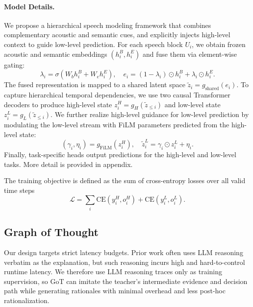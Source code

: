 \paragraph{Model Details.}
We propose a hierarchical speech modeling framework that combines complementary acoustic and semantic cues, and explicitly injects high-level context to guide low-level prediction. For each speech block $U_i$, we obtain frozen acoustic and semantic embeddings $(h_i^{B}, h_i^{E})$ and fuse them via element-wise gating:
\[
\lambda_i=\sigma(W_b h_i^{B}+W_e h_i^{E}),\quad
e_i=(1-\lambda_i)\odot h_i^{B}+\lambda_i\odot h_i^{E}.
\]
The fused representation is mapped to a shared latent space $\tilde z_i=g_{\text{shared}}(e_i)$. To capture hierarchical temporal dependencies, we use two causal Transformer decoders to produce high-level state $z_i^H=g_H(\tilde z_{\le i})$ and low-level state $z_i^L=g_L(\tilde z_{\le i})$.
We further realize high-level guidance for low-level prediction by modulating the low-level stream with FiLM parameters predicted from the high-level state:
\[
(\gamma_i,\eta_i)=g_{\text{FiLM}}(z_i^H),\quad
\tilde z_i^L=\gamma_i\odot z_i^L+\eta_i.
\]
Finally, task-specific heads output predictions for the high-level and low-level tasks. More detail is provided in appendix.

The training objective is defined as the sum of cross-entropy losses over all valid time steps
\begin{equation}
\mathcal{L}=\sum_i \mathrm{CE}\!\left(y_i^{H},o_i^{H}\right)+\mathrm{CE}\!\left(y_i^{L},o_i^{L}\right).
\end{equation}


\subsection{Graph of Thought}
Our design targets strict latency budgets. Prior work often uses LLM reasoning verbatim as the explanation, but such reasoning incurs high and hard-to-control runtime latency. We therefore use LLM reasoning traces only as training supervision, so GoT can imitate the teacher’s intermediate evidence and decision path while generating rationales with minimal overhead and less post-hoc rationalization.

